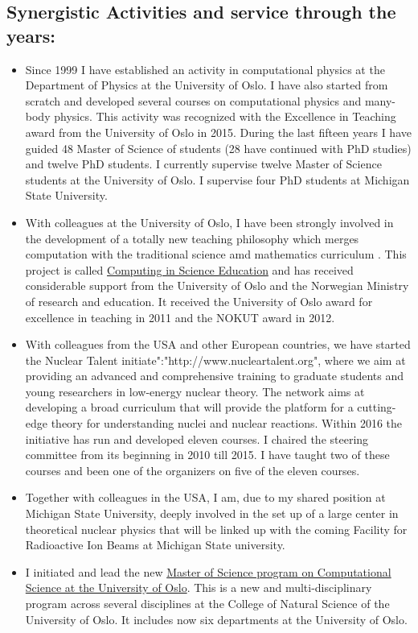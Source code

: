 \documentclass[%
oneside,                 %
final,                   %
10pt]{article}
\begin{document}
\noindent
\subsection*{Synergistic Activities and service through the years:}

\begin{itemize}
\item Since 1999 I have   established an activity in computational physics  at the  Department of Physics at the University of Oslo. I have also started from scratch and developed several  courses on computational physics and many-body physics. This activity was recognized with the Excellence in Teaching award from the University of Oslo in 2015. During the last fifteen years I have guided  48 Master of Science of students (28 have continued with PhD studies) and twelve PhD students.  I currently supervise twelve Master of Science students at the University of Oslo. I supervise four PhD students at Michigan State University.

\item With colleagues at the University of Oslo, I have   been strongly involved in the development of a totally new teaching philosophy which merges computation with the traditional science amd mathematics curriculum . This project is called \href{{http://www.mn.uio.no/english/about/collaboration/cse/}}{Computing in Science Education} and has received considerable support from the University of Oslo and the Norwegian Ministry of research and education.  It received the University of Oslo award for excellence in teaching  in 2011 and the NOKUT award in 2012. 

\item With colleagues from the USA and other European countries, we have started the Nuclear Talent initiate":"http://www.nucleartalent.org",  where we aim  at providing an advanced and comprehensive training to graduate students and young researchers in low-energy nuclear theory.  The network aims at developing a broad curriculum that will provide the platform for a cutting-edge theory for understanding nuclei and nuclear reactions.  Within 2016 the initiative has run and developed eleven courses. I chaired the steering committee from its beginning in 2010 till 2015. I have taught two of these courses and been one of the organizers on five of the eleven courses.

\item Together with colleagues in the USA, I am, due to my shared position at Michigan State University, deeply involved in the set up of a large center in theoretical nuclear physics that will be linked up with the coming Facility for Radioactive Ion Beams at Michigan State university. 

\item I initiated and lead the new \href{{http://mhjensen.github.io/CPMLS/doc/pub/Masterprogram/html/Masterprogram.html}}{Master of Science program on Computational Science at the University of Oslo}. This is a new and multi-disciplinary program across several disciplines at the College of Natural Science of the University of Oslo. It includes now six departments at the University of Oslo.
\end{itemize}
\end{document}
